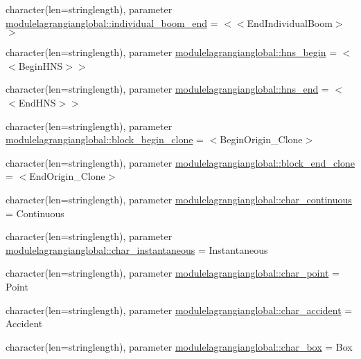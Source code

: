 \begin{DoxyCompactItemize}
\item 
character(len=stringlength), parameter \mbox{\hyperlink{namespacemodulelagrangianglobal_aadc9143ff714d0702105bda0be44b172}{modulelagrangianglobal\+::individual\+\_\+boom\+\_\+end}} = \textquotesingle{}$<$$<$End\+Individual\+Boom$>$$>$\textquotesingle{}
\item 
character(len=stringlength), parameter \mbox{\hyperlink{namespacemodulelagrangianglobal_ac54c551353c59baecfaba4b43054a9e1}{modulelagrangianglobal\+::hns\+\_\+begin}} = \textquotesingle{}$<$$<$Begin\+H\+NS$>$$>$\textquotesingle{}
\item 
character(len=stringlength), parameter \mbox{\hyperlink{namespacemodulelagrangianglobal_aca310c2a391c25bed641705bad337d1b}{modulelagrangianglobal\+::hns\+\_\+end}} = \textquotesingle{}$<$$<$End\+H\+NS$>$$>$\textquotesingle{}
\item 
character(len=stringlength), parameter \mbox{\hyperlink{namespacemodulelagrangianglobal_a72d87b3c8689cb2a78e711f2c9d6ad94}{modulelagrangianglobal\+::block\+\_\+begin\+\_\+clone}} = \textquotesingle{}$<$Begin\+Origin\+\_\+\+Clone$>$\textquotesingle{}
\item 
character(len=stringlength), parameter \mbox{\hyperlink{namespacemodulelagrangianglobal_a4dac83ce232fc5e2554c9375eb04f52d}{modulelagrangianglobal\+::block\+\_\+end\+\_\+clone}} = \textquotesingle{}$<$End\+Origin\+\_\+\+Clone$>$\textquotesingle{}
\item 
character(len=stringlength), parameter \mbox{\hyperlink{namespacemodulelagrangianglobal_a73a22e2486adc23fda36ea4096bb6f3f}{modulelagrangianglobal\+::char\+\_\+continuous}} = \textquotesingle{}Continuous\textquotesingle{}
\item 
character(len=stringlength), parameter \mbox{\hyperlink{namespacemodulelagrangianglobal_a2ad0e99422a2ba20bc3cfaeca9f8b403}{modulelagrangianglobal\+::char\+\_\+instantaneous}} = \textquotesingle{}Instantaneous\textquotesingle{}
\item 
character(len=stringlength), parameter \mbox{\hyperlink{namespacemodulelagrangianglobal_ad4ad6727c1b4f305f002d4480562fa1d}{modulelagrangianglobal\+::char\+\_\+point}} = \textquotesingle{}Point\textquotesingle{}
\item 
character(len=stringlength), parameter \mbox{\hyperlink{namespacemodulelagrangianglobal_a7b92a58d2eedd4d13283e156746f7b30}{modulelagrangianglobal\+::char\+\_\+accident}} = \textquotesingle{}Accident\textquotesingle{}
\item 
character(len=stringlength), parameter \mbox{\hyperlink{namespacemodulelagrangianglobal_a53e3871a9468c7d2cf5509993d60f449}{modulelagrangianglobal\+::char\+\_\+box}} = \textquotesingle{}Box\textquotesingle{}

\end{DoxyCompactItemize}
